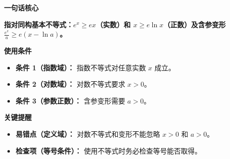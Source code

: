 \begin{summarybox}
	\textbf{\textcolor{CSummary}{一句话核心}}

	\textbf{指对同构基本不等式：$e^x\ge e x$（实数）和 $x\ge e\ln x$（正数）及含参变形 $\frac{e^x}{a}\ge e(x-\ln a)$。}

	\medskip
	\textbf{\textcolor{CSummary}{使用条件}}
	\begin{itemize}[leftmargin=*, itemsep=0.5em, topsep=0.4em]
		\item \textbf{条件 1（指数域）：} 指数不等式对任意实数 $x$ 成立。
		\item \textbf{条件 2（对数域）：} 对数不等式要求 $x>0$。
		\item \textbf{条件 3（参数正数）：} 含参变形需要 $a>0$。
	\end{itemize}

	\medskip
	\textbf{\textcolor{CSummary}{关键提醒}}
	\begin{itemize}[leftmargin=*, itemsep=0.5em, topsep=0.4em]
		\item \textbf{易错点（定义域）：} 对数不等式和变形不能忽略 $x>0$ 和 $a>0$。
		\item \textbf{检查项（等号条件）：} 使用不等式时务必检查等号能否取得。
	\end{itemize}
\end{summarybox}

